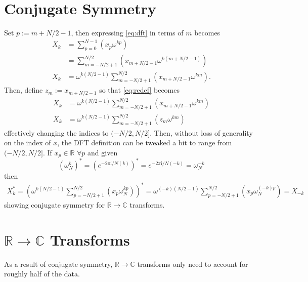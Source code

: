 \documentclass{article}
\begin{document}
\section {Conjugate Symmetry}
%
Set $p := m + N/2 - 1$, then expressing \eqref{eq:dft} in terms of $m$ becomes
%
\begin {equation} \label {eq:redef}
\begin {aligned}
X_k &= \sum_{p = 0}^{N-1} (x_p \omega^{k p}) \\
    &= \sum_{m = -N/2 + 1}^{N/2} (x_{m + N/2 - 1} \omega^{k (m + N/2 - 1)}) \\
X_k &= \omega^{k (N/2 - 1)} \sum_{m = -N/2 + 1}^{N/2} (x_{m + N/2 - 1} \omega^{k m}).
\end {aligned}
\end {equation}
%
Then, define $z_m := x_{m + N/2 - 1}$ so that \eqref{eq:redef} becomes
%
\begin {equation}
\begin {aligned}
X_k &= \omega^{k (N/2 - 1)} \sum_{m = -N/2 + 1}^{N/2} (x_{m + N/2 - 1} \omega^{k m}) \\
X_k &= \omega^{k (N/2 - 1)} \sum_{m = -N/2 + 1}^{N/2} (z_m \omega^{k m})
\end {aligned}
\end {equation}
%
effectively changing the indices to $(-N/2, N/2]$.
Then, without loss of generality on the index of $x$, the DFT definition can be tweaked a bit to range from $(-N/2, N/2]$.
If $x_p \in \mathbb {R}$ $\forall p$ and given
%
\begin {equation}
\left (\omega_N^{k} \right)^*
 = \left (e^{-2 \pi \mathrm {i} / N (k)} \right)^* 
 = e^{-2 \pi \mathrm {i} / N (-k)} 
 = \omega_{N}^{-k}
\end {equation}
%
then
%
\begin {equation}
\begin {aligned}
X_k^* = \left( \omega^{k (N/2 - 1)} \sum_{p = -N/2+1}^{N/2} (x_p \omega_N^{k p}) \right)^*
      = \omega^{(-k) (N/2 - 1)} \sum_{p = -N/2+1}^{N/2} (x_p \omega_N^{(-k) p})
      = X_{-k}
\end {aligned}
\end {equation}
%
showing conjugate symmetry for $\mathbb{R} \rightarrow \mathbb{C}$ transforms.

\section {$\mathbb{R} \rightarrow \mathbb{C}$ Transforms}
%
As a result of conjugate symmetry, $\mathbb{R} \rightarrow \mathbb{C}$ transforms only need to account for roughly half of the data.
\end{document}
